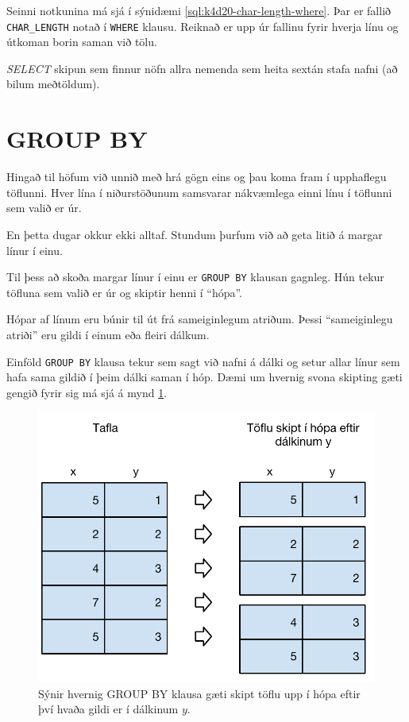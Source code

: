 Seinni notkunina má sjá í sýnidæmi \ref{sql:k4d20-char-length-where}. Þar er fallið \verb|CHAR_LENGTH| notað í \verb|WHERE| klausu. Reiknað er upp úr fallinu fyrir hverja línu og útkoman borin saman við tölu.

\begin{example}
\caption[CHAR\_LENGTH í WHERE klausu]{\emph{SELECT} skipun sem finnur nöfn allra nemenda sem heita sextán stafa nafni (að bilum meðtöldum).}
\label{sql:k4d20-char-length-where}
\centering
{}
\end{example}

\section{GROUP BY}
Hingað til höfum við unnið með hrá gögn eins og þau koma fram í upphaflegu töflunni. Hver lína í niðurstöðunum samsvarar nákvæmlega einni línu í töflunni sem valið er úr.

En þetta dugar okkur ekki alltaf. Stundum þurfum við að geta litið á margar línur í einu.

Til þess að skoða margar línur í einu er \verb|GROUP BY| klausan gagnleg. Hún tekur töfluna sem valið er úr og skiptir henni í ``hópa''.

Hópar af línum eru búnir til út frá sameiginlegum atriðum. Þessi ``sameiginlegu atriði'' eru gildi í einum eða fleiri dálkum. 

Einföld \verb|GROUP BY| klausa tekur sem sagt við nafni á dálki og setur allar línur sem hafa sama gildið í þeim dálki saman í hóp. Dæmi um hvernig svona skipting gæti gengið fyrir sig má sjá á mynd \ref{mynd:group-by}.

\begin{figure}
\caption[GROUP BY]{Sýnir hvernig GROUP BY klausa gæti skipt töflu upp í hópa eftir því hvaða gildi er í dálkinum $y$.}
\label{mynd:group-by}
\centering
\includegraphics[width=\linewidth]{myndir/group-by}
\end{figure}

